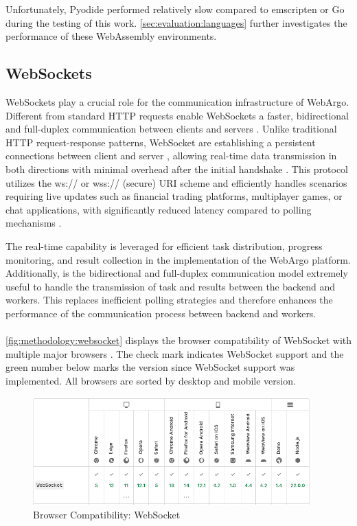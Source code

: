 Unfortunately, Pyodide performed relatively slow compared to emscripten or Go during the testing of this work. \autoref{sec:evaluation:languages} further investigates the performance of these WebAssembly environments. 

\subsection{WebSockets}
\label{sec:methodology:websockets}
WebSockets play a crucial role for the communication infrastructure of WebArgo. Different from standard \acs{HTTP} requests enable WebSockets a faster, bidirectional and full-duplex communication between clients and servers \cite{methodology:websockets1, methodology:websockets3, methodology:websockets2}. Unlike traditional \acs{HTTP} request-response patterns, WebSocket are establishing a persistent connections between client and server \cite{methodology:websockets3}, allowing real-time data transmission in both directions with minimal overhead after the initial handshake \cite{methodology:websockets3}. This protocol utilizes the ws:// or wss:// (secure) \ac{URI} scheme and efficiently handles scenarios requiring live updates such as financial trading platforms, multiplayer games, or chat applications, with significantly reduced latency compared to polling mechanisms \cite{methodology:websockets3}.

The real-time capability is leveraged for efficient task distribution, progress monitoring, and result collection in the implementation of the WebArgo platform. Additionally, is the bidirectional and full-duplex communication model extremely useful to handle the transmission of task and results between the backend and workers. This replaces inefficient polling strategies and therefore enhances the performance of the communication process between backend and workers.
\\~\\
\autoref{fig:methodology:websocket} displays the browser compatibility of WebSocket with multiple major browsers \cite{methodology:websockets1}. The check mark indicates WebSocket support and the green number below marks the version since WebSocket support was implemented. All browsers are sorted by desktop and mobile version.
\begin{figure}[htbp]
  \centering
  \includegraphics[width=0.95\textwidth]{gfx/figures/websocket-browsercompability.png}
  \caption{Browser Compatibility: WebSocket \cite{methodology:websockets1}}
  \label{fig:methodology:websocket}
\end{figure}


